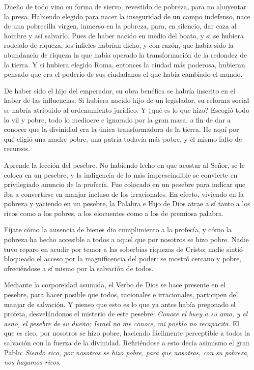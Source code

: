 \begin{body}
	 Dueño de todo vino en forma de siervo, revestido de pobreza, para no ahuyentar la presa. Habiendo elegido para nacer la inseguridad de un campo indefenso, nace de una pobrecilla virgen, inmerso en la pobreza, para, en silencio, dar caza al hombre y así salvarlo. Pues de haber nacido en medio del boato, y si se hubiera rodeado de riqueza, los infieles habrían dicho, y con razón, que había sido la abundancia de riqueza la que había operado la transformación de la redondez de la tierra. Y si hubiera elegido Roma, entonces la ciudad más poderosa, hubieran pensado que era el poderío de sus ciudadanos el que había cambiado el mundo.
	
	De haber sido el hijo del emperador, su obra benéfica se habría inscrito en el haber de las influencias. Si hubiera nacido hijo de un legislador, su reforma social se habría atribuido al ordenamiento jurídico. Y ¿qué es lo que hizo? Escogió todo lo vil y pobre, todo lo mediocre e ignorado por la gran masa, a fin de dar a conocer que la divinidad era la única transformadora de la tierra. He aquí por qué eligió una madre pobre, una patria todavía más pobre, y él mismo falto de recursos.
	
	Aprende la lección del pesebre. No habiendo lecho en que acostar al Señor, se le coloca en un pesebre, y la indigencia de lo más imprescindible se convierte en privilegiado anuncio de la profecía. Fue colocado en un pesebre para indicar que iba a convertirse en manjar incluso de los irracionales. En efecto, viviendo en la pobreza y yaciendo en un pesebre, la Palabra e Hijo de Dios atrae a sí tanto a los ricos como a los pobres, a los elocuentes como a los de premiosa palabra.
	
	Fíjate cómo la ausencia de bienes dio cumplimiento a la profecía, y cómo la pobreza ha hecho accesible a todos a aquel que por nosotros se hizo pobre. Nadie tuvo reparo en acudir por temor a las soberbias riquezas de Cristo; nadie sintió bloqueado el acceso por la magnificencia del poder: se mostró cercano y pobre, ofreciéndose a sí mismo por la salvación de todos.
	
	Mediante la corporeidad asumida, el Verbo de Dios se hace presente en el pesebre, para hacer posible que todos, racionales e irracionales, participen del manjar de salvación. Y pienso que esto es lo que ya antes había pregonado el profeta, desvelándonos el misterio de este pesebre: \emph{Conoce el buey a su amo, y el asno, el pesebre de su dueño; Israel no me conoce, mi pueblo no recapacita}. El que es rico, por nosotros se hizo pobre, haciendo fácilmente perceptible a todos la salvación con la fuerza de la divinidad. Refiriéndose a esto decía asimismo el gran Pablo: \emph{Siendo rico, por nosotros se hizo pobre, para que nosotros, con su pobreza, nos hagamos ricos}.
	

\end{body}
